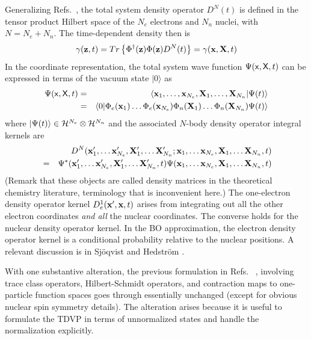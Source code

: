 Generalizing Refs.~, the total system density
operator $D^{N}(t)$ is defined in the tensor product Hilbert space of the $%
N_{e}$ electrons and $N_{n}$ nuclei, with $N=N_{e}+N_{n}$. The
time-dependent density then is 
\begin{equation}
\gamma ({\bf z},t)=Tr\left\{ \Phi ^{\dagger }({\bf z})\Phi ({\bf z}%
)D^{N}(t)\right\} =\gamma ({\bf x},{\bf X},t)
\end{equation}%
In the coordinate representation, the total system wave function $\Psi ({\sf %
x},{\sf X},t)$ can be expressed in terms of the vacuum state $|0\rangle $ as 
\begin{eqnarray}
\Psi ({\sf x},{\sf X},t) &=&\langle {\bf x}_{1},\ldots ,{\bf x}_{N_{e}},{\bf %
X}_{1},\ldots ,{\bf X}_{N_{n}}|\Psi (t)\rangle  \nonumber \\
&=&\langle 0|\Phi _{e}({\bf x}_{1})\ldots \Phi _{e}({\bf x}_{N_{e}})\Phi
_{n}({\bf X}_{1})\ldots \Phi _{n}({\bf X}_{N_{n}})\Psi (t)\rangle
\end{eqnarray}%
where $|\Psi (t)\rangle \in {\cal H}^{N_{e}}\otimes {\cal H}^{N_{n}}$ and
the associated $N$-body density operator integral kernels are 
\begin{eqnarray}
&&D^{N}({\bf x}_{1}^{\prime },\ldots {\bf x}_{N_{e}}^{\prime },{\bf X}%
_{1}^{\prime },\ldots {\bf X}_{N_{n}}^{\prime };{\bf x}_{1},\ldots {\bf x}%
_{N_{e}},{\bf X}_{1},\ldots {\bf X}_{N_{n}},t)  \nonumber \\
&=&\Psi ^{\ast }({\bf x}_{1}^{\prime },\ldots {\bf x}_{N_{e}}^{\prime },{\bf %
X}_{1}^{\prime },\ldots {\bf X}_{N_{n}}^{\prime },t)\Psi ({\bf x}_{1},\ldots 
{\bf x}_{N_{e}},{\bf X}_{1},\ldots {\bf X}_{N_{n}},t)
\end{eqnarray}%
(Remark that these objects are called density matrices in the theoretical
chemistry literature, terminology that is inconvenient here.) The
one-electron density operator kernel $D_{e}^{1}({\bf x}^{\prime },{\bf x},t)$
arises from integrating out all the other electron coordinates {\em and all}
the nuclear coordinates. The converse holds for the nuclear density operator
kernel. In the BO approximation, the electron density operator kernel is a
conditional probability relative to the nuclear positions. A relevant
discussion is in Sj\"{o}qvist and Hedstr\"{o}m \cite{Sjoqvist}.

With one substantive alteration, the previous formulation in Refs.~%
, involving trace class operators,
Hilbert-Schmidt operators, and contraction maps to one-particle function
spaces goes through essentially unchanged (except for obvious nuclear spin
symmetry details). The alteration arises because it is useful to formulate
the TDVP in terms of unnormalized states and handle the normalization
explicitly.

